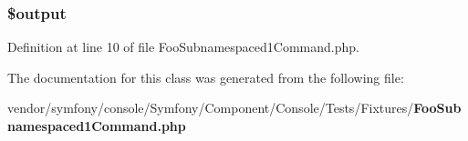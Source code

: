 \subsubsection[{\$output}]{\setlength{\rightskip}{0pt plus 5cm}\$output}\label{class_foo_subnamespaced1_command_a73004ce9cd673c1bfafd1dc351134797}


Definition at line 10 of file Foo\+Subnamespaced1\+Command.\+php.



The documentation for this class was generated from the following file\+:\begin{DoxyCompactItemize}
\item 
vendor/symfony/console/\+Symfony/\+Component/\+Console/\+Tests/\+Fixtures/{\bf Foo\+Subnamespaced1\+Command.\+php}\end{DoxyCompactItemize}

